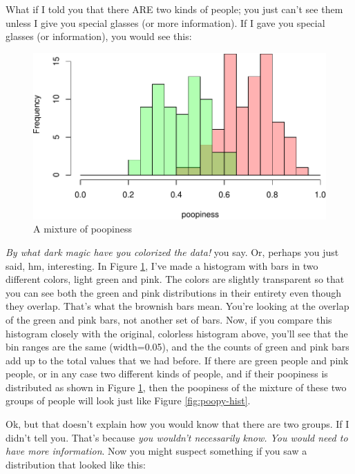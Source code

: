 \documentclass[]{book}
\begin{document}
What if I told you that there ARE two kinds of people; you just can't see them unless I give you special glasses (or more information). If I gave you special glasses (or information), you would see this:

\begin{figure}
\centering
\includegraphics{bigquestions-book_files/figure-latex/poopy-hist-mixture-1.pdf}
\caption{\label{fig:poopy-hist-mixture}A mixture of poopiness}
\end{figure}

\emph{By what dark magic have you colorized the data!} you say. Or, perhaps you just said, hm, interesting.
In Figure \ref{fig:poopy-hist-mixture}, I've made a histogram with bars in two different colors, light green and pink. The colors are slightly transparent so that you can see both the green and pink distributions in their entirety even though they overlap. That's what the brownish bars mean. You're looking at the overlap of the green and pink bars, not another set of bars. Now, if you compare this histogram closely with the original, colorless histogram above, you'll see that the bin ranges are the same (width=0.05), and the the counts of green and pink bars add up to the total values that we had before. If there are green people and pink people, or in any case two different kinds of people, and if their poopiness is distributed as shown in Figure \ref{fig:poopy-hist-mixture}, then the poopiness of the mixture of these two groups of people will look just like Figure \ref{fig:poopy-hist}.

Ok, but that doesn't explain how you would know that there are two groups. If I didn't tell you. That's because \emph{you wouldn't necessarily know. You would need to have more information}. Now you might suspect something if you saw a distribution that looked like this:
\end{document}
